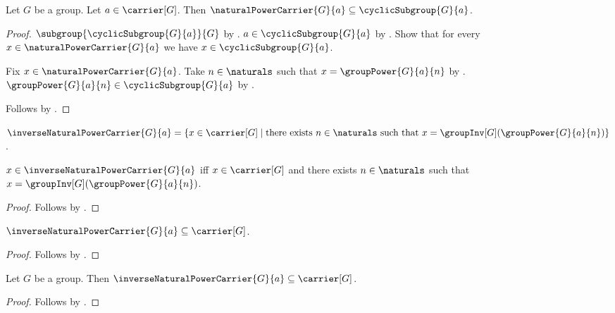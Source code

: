 \begin{theorem}\label{natural_power_carrier_subseteq_cyclic_subgroup}
    Let $G$ be a group.
    Let $a\in\carrier[G]$.
    Then
        $\naturalPowerCarrier{G}{a}\subseteq\cyclicSubgroup{G}{a}$.
\end{theorem}
\begin{proof}
    $\subgroup{\cyclicSubgroup{G}{a}}{G}$ by
        .
    $a\in\cyclicSubgroup{G}{a}$ by
        .
    Show that for every $x\in\naturalPowerCarrier{G}{a}$ we have
        $x\in\cyclicSubgroup{G}{a}$.
    \begin{subproof}
        Fix $x\in\naturalPowerCarrier{G}{a}$.
        Take $n\in\naturals$ such that
            $x=\groupPower{G}{a}{n}$ by
            .
        $\groupPower{G}{a}{n}\in\cyclicSubgroup{G}{a}$ by
            .
    \end{subproof}
    Follows by .
\end{proof}

\begin{definition}\label{inverse_natural_power_carrier}
    $\inverseNaturalPowerCarrier{G}{a}=
        \{x\in\carrier[G]\mid
            \text{there exists $n\in\naturals$ such that
                $x=\groupInv[G](\groupPower{G}{a}{n})$}\}$.
\end{definition}

\begin{proposition}\label{inverse_natural_power_carrier_iff}
    $x\in\inverseNaturalPowerCarrier{G}{a}$ iff
        $x\in\carrier[G]$ and
        there exists $n\in\naturals$ such that
            $x=\groupInv[G](\groupPower{G}{a}{n})$.
\end{proposition}
\begin{proof}
    Follows by .
\end{proof}

\begin{proposition}\label{inverse_natural_power_carrier_subseteq}
    $\inverseNaturalPowerCarrier{G}{a}\subseteq\carrier[G]$.
\end{proposition}
\begin{proof}
    Follows by
        .
\end{proof}

\begin{classification}\label{inverse_natural_power_carrier_is_subset_in_group}
    Let $G$ be a group.
    Then $\inverseNaturalPowerCarrier{G}{a}\subseteq\carrier[G]$.
\end{classification}
\begin{proof}
    Follows by .
\end{proof}

